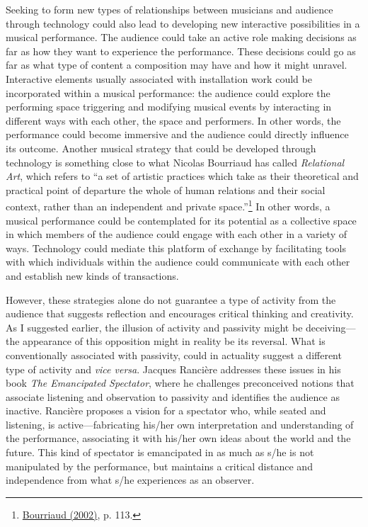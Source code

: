 Seeking to form new types of relationships between musicians and audience through technology could also lead to developing new interactive possibilities in a musical performance. The audience could take an active role making decisions as far as how they want to experience the performance. These decisions could go as far as what type of content a composition may have and how it might unravel. Interactive elements usually associated with installation work could be incorporated within a musical performance: the audience could explore the performing space triggering and modifying musical events by interacting in different ways with each other, the space and performers. In other words, the performance could become immersive and the audience could directly influence its outcome. Another musical strategy that could be developed through technology is something close to what Nicolas Bourriaud has called \emph{Relational Art}, which refers to ``a set of artistic practices which take as their theoretical and practical point of departure the whole of human relations and their social context, rather than an independent and private space.''\footnote{\hyperlink{relational}{Bourriaud (2002)}, p. 113.} In other words, a musical performance could be contemplated for its potential as a collective space in which members of the audience could engage with each other in a variety of ways. Technology could mediate this platform of exchange by facilitating tools with which individuals within the audience could communicate with each other and establish new kinds of transactions.

However, these strategies alone do not guarantee a type of activity from the audience that suggests reflection and encourages critical thinking and creativity. As I suggested earlier, the illusion of activity and passivity might be deceiving---the appearance of this opposition might in reality be its reversal. What is conventionally associated with passivity, could in actuality suggest a different type of activity and \emph{vice versa}. Jacques Ranci\`{e}re addresses these issues in his book \emph{The Emancipated Spectator}, where he challenges preconceived notions that associate listening and observation to passivity and identifies the audience as inactive. Ranci\`{e}re proposes a vision for a spectator who, while seated and listening, is active---fabricating his/her own interpretation and understanding of the performance, associating it with his/her own ideas about the world and the future. This kind of spectator is emancipated in as much as s/he is not manipulated by the performance, but maintains a critical distance and independence from what s/he experiences as an observer.

